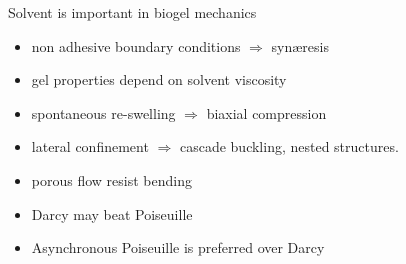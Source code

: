 \begin{frame}{Solvent is important in biogel mechanics}

\begin{itemize}
	\item non adhesive boundary conditions $\Rightarrow$ synæresis
	\item gel properties depend on solvent viscosity
\end{itemize}

\bigskip
{}
\begin{itemize}
	\item spontaneous re-swelling $\Rightarrow$ biaxial compression
	\item lateral confinement $\Rightarrow$ cascade buckling, nested structures.
\end{itemize}

\bigskip
{}
\begin{itemize}
	\item porous flow resist bending
	\item Darcy may beat Poiseuille
	\item Asynchronous Poiseuille is preferred over Darcy
\end{itemize}


\end{frame}

